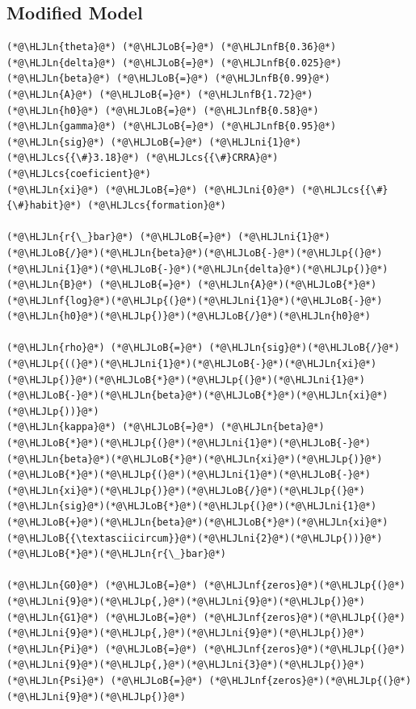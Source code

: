 \documentclass[12pt,a4paper]{article}
\newcommand{\HLJLn}[1]{#1}
\newcommand{\HLJLnf}[1]{\textcolor[RGB]{66,102,213}{#1}}
\newcommand{\HLJLnfB}[1]{\textcolor[RGB]{59,151,46}{#1}}
\newcommand{\HLJLni}[1]{\textcolor[RGB]{59,151,46}{#1}}
\newcommand{\HLJLoB}[1]{\textcolor[RGB]{102,102,102}{\textbf{#1}}}
\newcommand{\HLJLp}[1]{#1}
\newcommand{\HLJLcs}[1]{\textcolor[RGB]{153,153,119}{\textit{#1}}}
\begin{document}
\subsection{Modified Model}

\begin{lstlisting}
(*@\HLJLn{theta}@*) (*@\HLJLoB{=}@*) (*@\HLJLnfB{0.36}@*)
(*@\HLJLn{delta}@*) (*@\HLJLoB{=}@*) (*@\HLJLnfB{0.025}@*)
(*@\HLJLn{beta}@*) (*@\HLJLoB{=}@*) (*@\HLJLnfB{0.99}@*)
(*@\HLJLn{A}@*) (*@\HLJLoB{=}@*) (*@\HLJLnfB{1.72}@*)
(*@\HLJLn{h0}@*) (*@\HLJLoB{=}@*) (*@\HLJLnfB{0.58}@*)
(*@\HLJLn{gamma}@*) (*@\HLJLoB{=}@*) (*@\HLJLnfB{0.95}@*)
(*@\HLJLn{sig}@*) (*@\HLJLoB{=}@*) (*@\HLJLni{1}@*)(*@\HLJLcs{{\#}3.18}@*) (*@\HLJLcs{{\#}CRRA}@*) (*@\HLJLcs{coeficient}@*)
(*@\HLJLn{xi}@*) (*@\HLJLoB{=}@*) (*@\HLJLni{0}@*) (*@\HLJLcs{{\#}{\#}habit}@*) (*@\HLJLcs{formation}@*)

(*@\HLJLn{r{\_}bar}@*) (*@\HLJLoB{=}@*) (*@\HLJLni{1}@*)(*@\HLJLoB{/}@*)(*@\HLJLn{beta}@*)(*@\HLJLoB{-}@*)(*@\HLJLp{(}@*)(*@\HLJLni{1}@*)(*@\HLJLoB{-}@*)(*@\HLJLn{delta}@*)(*@\HLJLp{)}@*)
(*@\HLJLn{B}@*) (*@\HLJLoB{=}@*) (*@\HLJLn{A}@*)(*@\HLJLoB{*}@*)(*@\HLJLnf{log}@*)(*@\HLJLp{(}@*)(*@\HLJLni{1}@*)(*@\HLJLoB{-}@*)(*@\HLJLn{h0}@*)(*@\HLJLp{)}@*)(*@\HLJLoB{/}@*)(*@\HLJLn{h0}@*)

(*@\HLJLn{rho}@*) (*@\HLJLoB{=}@*) (*@\HLJLn{sig}@*)(*@\HLJLoB{/}@*)(*@\HLJLp{((}@*)(*@\HLJLni{1}@*)(*@\HLJLoB{-}@*)(*@\HLJLn{xi}@*)(*@\HLJLp{)}@*)(*@\HLJLoB{*}@*)(*@\HLJLp{(}@*)(*@\HLJLni{1}@*)(*@\HLJLoB{-}@*)(*@\HLJLn{beta}@*)(*@\HLJLoB{*}@*)(*@\HLJLn{xi}@*)(*@\HLJLp{))}@*)
(*@\HLJLn{kappa}@*) (*@\HLJLoB{=}@*) (*@\HLJLn{beta}@*)(*@\HLJLoB{*}@*)(*@\HLJLp{(}@*)(*@\HLJLni{1}@*)(*@\HLJLoB{-}@*)(*@\HLJLn{beta}@*)(*@\HLJLoB{*}@*)(*@\HLJLn{xi}@*)(*@\HLJLp{)}@*)(*@\HLJLoB{*}@*)(*@\HLJLp{(}@*)(*@\HLJLni{1}@*)(*@\HLJLoB{-}@*)(*@\HLJLn{xi}@*)(*@\HLJLp{)}@*)(*@\HLJLoB{/}@*)(*@\HLJLp{(}@*)(*@\HLJLn{sig}@*)(*@\HLJLoB{*}@*)(*@\HLJLp{(}@*)(*@\HLJLni{1}@*)(*@\HLJLoB{+}@*)(*@\HLJLn{beta}@*)(*@\HLJLoB{*}@*)(*@\HLJLn{xi}@*)(*@\HLJLoB{{\textasciicircum}}@*)(*@\HLJLni{2}@*)(*@\HLJLp{))}@*)(*@\HLJLoB{*}@*)(*@\HLJLn{r{\_}bar}@*)

(*@\HLJLn{G0}@*) (*@\HLJLoB{=}@*) (*@\HLJLnf{zeros}@*)(*@\HLJLp{(}@*)(*@\HLJLni{9}@*)(*@\HLJLp{,}@*)(*@\HLJLni{9}@*)(*@\HLJLp{)}@*)
(*@\HLJLn{G1}@*) (*@\HLJLoB{=}@*) (*@\HLJLnf{zeros}@*)(*@\HLJLp{(}@*)(*@\HLJLni{9}@*)(*@\HLJLp{,}@*)(*@\HLJLni{9}@*)(*@\HLJLp{)}@*)
(*@\HLJLn{Pi}@*) (*@\HLJLoB{=}@*) (*@\HLJLnf{zeros}@*)(*@\HLJLp{(}@*)(*@\HLJLni{9}@*)(*@\HLJLp{,}@*)(*@\HLJLni{3}@*)(*@\HLJLp{)}@*)
(*@\HLJLn{Psi}@*) (*@\HLJLoB{=}@*) (*@\HLJLnf{zeros}@*)(*@\HLJLp{(}@*)(*@\HLJLni{9}@*)(*@\HLJLp{)}@*)


\end{lstlisting}
\end{document}
